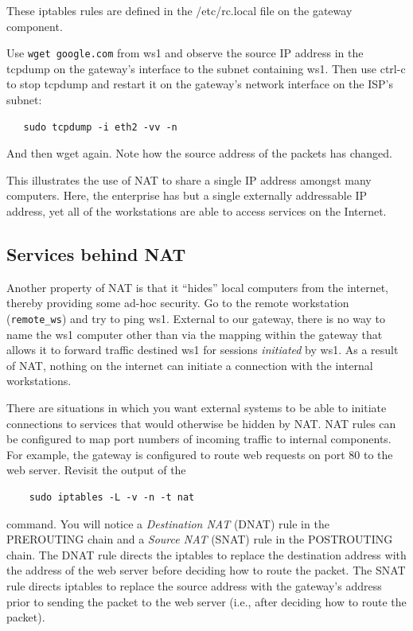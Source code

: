 These iptables rules are defined in the /etc/rc.local file on the gateway component.  

Use {\tt wget google.com} from ws1 and observe the source IP address in the tcpdump on the gateway's interface
to the subnet containing ws1.  Then use ctrl-c to stop tcpdump and restart it on the gateway's
network interface on the ISP's subnet:
\begin{verbatim}
   sudo tcpdump -i eth2 -vv -n
\end{verbatim}
\noindent And then wget again.  Note how the source address of the packets has changed.

This illustrates the use of NAT to share a single IP address amongst many computers.  Here,
the enterprise has but a single externally addressable IP address, yet all of the workstations are able to 
access services on the Internet.

\subsection{Services behind NAT}
Another property of NAT is that it ``hides'' local computers from the internet, thereby providing some
ad-hoc security.  Go to the remote workstation
({\tt remote\_ws}) and try to ping ws1.  External to our gateway, there is no way to name the ws1 computer other than
via the mapping within the gateway that allows it to forward traffic destined ws1 for sessions \textit{initiated} by ws1.
As a result of NAT, nothing on the internet can initiate a connection with the internal workstations.  

There are situations in which you want external systems to be able to initiate connections to services that would
otherwise be hidden by NAT.
NAT rules can be configured to map port numbers of incoming traffic to internal components.  For example, the gateway
is configured to route web requests on port 80 to the web server.  Revisit the output of the
\begin{verbatim}
    sudo iptables -L -v -n -t nat
\end{verbatim}
command. You will notice a \textit{Destination NAT} (DNAT) rule in the PREROUTING chain and 
a \textit{Source NAT} (SNAT) rule in the POSTROUTING chain. 
The DNAT rule directs the iptables to replace the destination address with the address of the web server before
deciding how to route the packet.
The SNAT rule directs iptables to replace the source address with the gateway's address prior to sending
the packet to the web server (i.e., after deciding how to route the packet).

